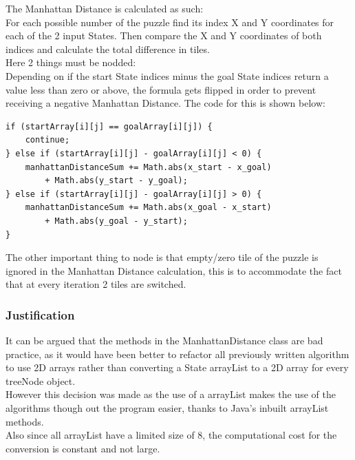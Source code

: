 \documentclass[journal]{IEEEtran}
\begin{document}
The Manhattan Distance is calculated as such:\\
For each possible number of the puzzle find its index X and Y coordinates for each of the 2 input States. Then compare the X and Y coordinates of both indices and calculate the total difference in tiles. \\

Here 2 things must be nodded:\\
Depending on if the start State indices minus the goal State indices return a value less than zero or above, the formula gets flipped in order to prevent receiving a negative Manhattan Distance. The code for this is shown below:\\
\begin{lstlisting}
if (startArray[i][j] == goalArray[i][j]) {
	continue;
} else if (startArray[i][j] - goalArray[i][j] < 0) {
	manhattanDistanceSum += Math.abs(x_start - x_goal)
		+ Math.abs(y_start - y_goal);
} else if (startArray[i][j] - goalArray[i][j] > 0) {
	manhattanDistanceSum += Math.abs(x_goal - x_start)
		+ Math.abs(y_goal - y_start);
}
\end{lstlisting}

The other important thing to node is that empty/zero tile of the puzzle is ignored in the Manhattan Distance calculation, this is to accommodate the fact that at every iteration 2 tiles are switched.\\

\subsubsection{Justification}
It can be argued that the methods in the ManhattanDistance class are bad practice, as it would have been better to refactor all previously written algorithm to use 2D arrays rather than converting a State arrayList to a 2D array for every treeNode object. \\
However this decision was made as the use of a arrayList makes the use of the algorithms though out the program easier, thanks to Java's inbuilt arrayList methods. \\
Also since all arrayList have a limited size of 8, the computational cost for the conversion is constant and not large. \\
\end{document}

